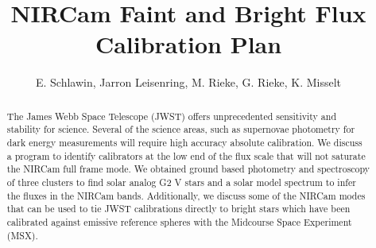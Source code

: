 \documentclass{aastex6}
\begin{document}

\title{NIRCam Faint and Bright Flux Calibration Plan}


\author{E. Schlawin, Jarron Leisenring, M. Rieke, G. Rieke, K. Misselt}




\begin{abstract}
The James Webb Space Telescope (JWST) offers unprecedented sensitivity and stability for science.
Several of the science areas, such as supernovae photometry for dark energy measurements will require high accuracy absolute calibration.
We discuss a program to identify calibrators at the low end of the flux scale that will not saturate the NIRCam full frame mode.
We obtained ground based photometry and spectroscopy of three clusters to find solar analog G2 V stars and a solar model spectrum to infer the fluxes in the NIRCam bands.
Additionally, we discuss some of the NIRCam modes that can be used to tie JWST calibrations directly to bright stars which have been calibrated against emissive reference spheres with the Midcourse Space Experiment (MSX).
\end{abstract}

\end{document}
